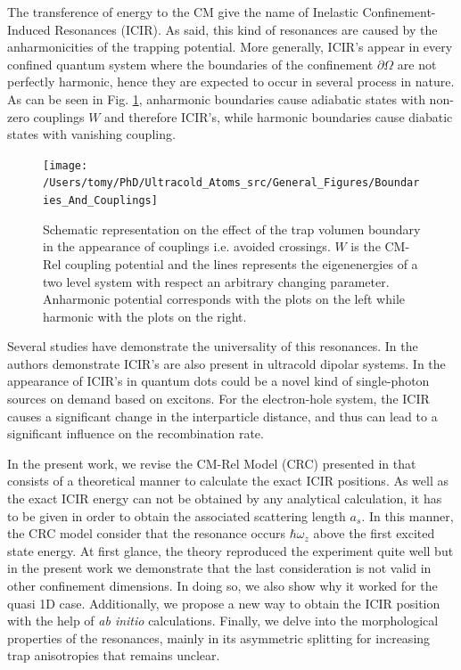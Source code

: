 \documentclass[aps,pre,twocolumn,superscriptaddress,showpacs]{revtex4-1}
\newcommand{\abinitio}{\textit{ab initio }}
\begin{document}
The transference of energy to the CM give the name of Inelastic Confinement-Induced Resonances (ICIR). As said, this kind of resonances are caused by the anharmonicities of the trapping potential. More generally, ICIR's appear in every confined quantum system where the boundaries of the confinement $\partial \Omega$ are not perfectly harmonic, hence they are expected to occur in several process in nature. As can be seen in Fig. \ref{fig:BandC}, anharmonic boundaries cause adiabatic states with non-zero couplings $W$ and therefore ICIR's, while harmonic boundaries cause diabatic states with vanishing coupling.
\begin{figure}[htbp!]
 \centering
\texttt{[image: /Users/tomy/PhD/Ultracold\_Atoms\_src/General\_Figures/Boundaries\_And\_Couplings]}
 \caption{Schematic representation on the effect of the trap volumen boundary in the appearance of couplings i.e. avoided crossings. $W$ is the CM-Rel coupling potential and the lines represents the eigenenergies of a two level system with respect an arbitrary changing parameter. Anharmonic potential corresponds with the plots on the left while harmonic with the plots on the right.}
 \label{fig:BandC}
 \end{figure}
 
 Several studies have demonstrate the universality of this resonances. In \cite{schulz2015resonances} the authors demonstrate  ICIR's are also present in ultracold dipolar systems. In \cite{Troppenz2015InelasticCR} the appearance of ICIR's in quantum dots could be a novel kind of single-photon sources on demand based on excitons. For the electron-hole system, the ICIR causes a significant change in the interparticle distance, and thus can lead to a significant influence on the recombination rate. 

In the present work, we revise the CM-Rel Model (CRC) presented in \cite{PhysRevLett.109.073201} that consists of a theoretical manner to calculate the exact ICIR positions. As well as the exact ICIR energy can not be obtained by any analytical calculation, it has to be given in order to obtain the associated scattering length $a_s$. In this manner, the CRC model consider that the resonance occurs $\hbar \omega_z$ above the first excited state energy. At first glance, the theory reproduced the experiment quite well but in the present work we demonstrate that the last consideration is not valid in other confinement dimensions. In doing so, we also show why it worked for the quasi 1D case. Additionally,  we propose a new way to obtain the ICIR position with the help of \abinitio calculations. Finally, we delve into the morphological properties of the resonances, mainly in its asymmetric splitting for increasing trap anisotropies that remains unclear. 
\end{document}
